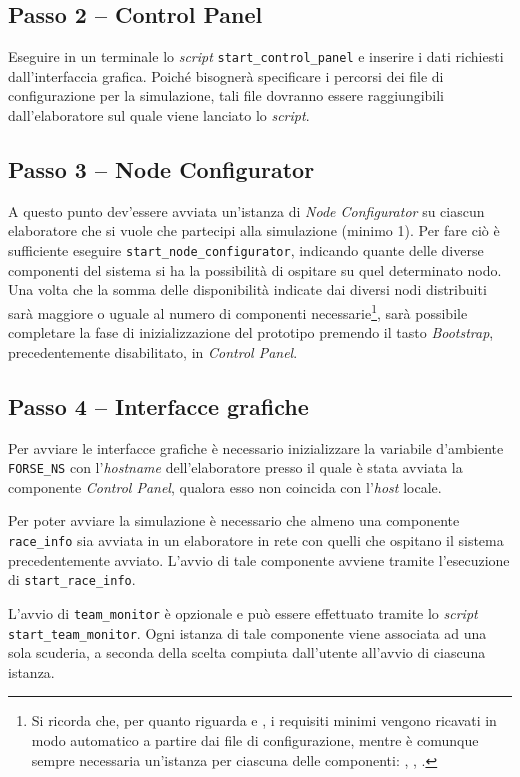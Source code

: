 \subsection*{Passo 2 -- Control Panel}
Eseguire in un terminale lo \textit{script} \texttt{start\_control\_panel} e inserire i dati richiesti dall'interfaccia grafica.
Poiché bisognerà specificare i percorsi dei file di configurazione per la simulazione, tali file dovranno essere raggiungibili dall'elaboratore sul quale viene lanciato lo \textit{script}.

\subsection*{Passo 3 -- Node Configurator}
A questo punto dev'essere avviata un'istanza di \textsl{Node Configurator} su ciascun elaboratore che si vuole che partecipi alla simulazione (minimo 1). Per fare ciò è sufficiente eseguire \texttt{start\_node\_configurator}, indicando quante delle diverse componenti del sistema si ha la possibilità di ospitare su quel determinato nodo.
Una volta che la somma delle disponibilità indicate dai diversi nodi distribuiti sarà maggiore o uguale al numero di componenti necessarie\footnote{Si ricorda che, per quanto riguarda \car{} e \team{}, i requisiti minimi vengono ricavati in modo automatico a partire dai file di configurazione, mentre è comunque sempre necessaria un'istanza per ciascuna delle componenti: \evdisp{}, \sched{}, \weather{}.}, sarà possibile completare la fase di inizializzazione del prototipo premendo il tasto \textsl{Bootstrap}, precedentemente disabilitato, in \textsl{Control Panel}.

\subsection*{Passo 4 -- Interfacce grafiche}
Per avviare le interfacce grafiche è necessario inizializzare la variabile d'ambiente \texttt{FORSE\_NS} con l'\textit{hostname} dell'elaboratore presso il quale è stata avviata la componente \textsl{Control Panel}, qualora esso non coincida con l'\textit{host} locale.

Per poter avviare la simulazione è necessario che almeno una componente \texttt{race\_info} sia avviata in un elaboratore in rete con quelli che ospitano il sistema precedentemente avviato. L'avvio di tale componente avviene tramite l'esecuzione di \texttt{start\_race\_info}.

L'avvio di \texttt{team\_monitor} è opzionale e può essere effettuato tramite lo \textit{script} \texttt{start\_team\_monitor}. Ogni istanza di tale componente viene associata ad una sola scuderia, a seconda della scelta compiuta dall'utente all'avvio di ciascuna istanza.

